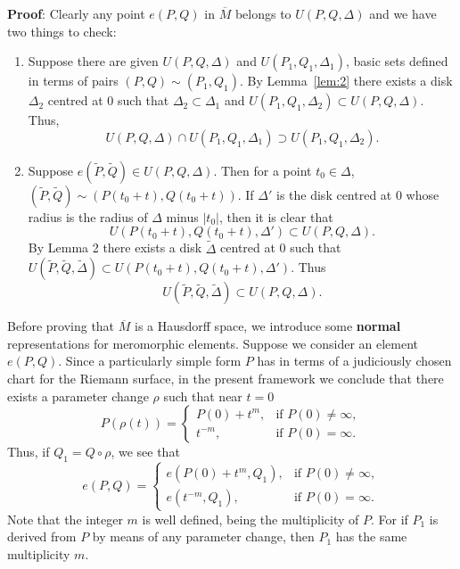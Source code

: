 \documentclass[a4paper,11pt]{article}
\begin{document}
\begin{mdframed}
  \textbf{Proof}:  Clearly any point $e(P,Q)$ in $\overline{M}$
  belongs to $U(P,Q,\Delta)$ and we have two things to check:
  \begin{enumerate}
  \item Suppose there are given $U(P,Q,\Delta)$ and $U(P_1, Q_1,
    \Delta_1)$, basic sets defined in terms of pairs $(P,Q) \sim (P_1,
    Q_1)$.  By Lemma~\ref{lem:2} there exists a disk $\Delta_2$
    centred at 0 such that $\Delta_2 \subset \Delta_1$ and $U(P_1,
    Q_1, \Delta_2) \subset U(P,Q,\Delta)$.  Thus,
    $$
    U(P,Q,\Delta) \cap U(P_1, Q_1, \Delta_1) \supset 
    U(P_1, Q_1, \Delta_2).
    $$
  \item Suppose $e(\widetilde{P},\widetilde{Q}) \in U(P,Q,\Delta)$.
    Then for a point $t_0 \in \Delta$, $(\widetilde{P},\widetilde{Q})
    \sim (P(t_0 + t), Q(t_0 + t))$.  If $\Delta'$ is the disk centred
    at 0 whose radius is the radius of $\Delta$ minus $|t_0|$, then it
    is clear that
    $$
    U(P(t_0+t), Q(t_0 + t), \Delta') \subset U(P,Q,\Delta).
    $$
    By Lemma 2 there exists a disk $\widetilde{\Delta}$ centred at 0
    such that $U(\widetilde{P},\widetilde{Q},\widetilde{\Delta})
    \subset U(P(t_0 + t), Q(t_0 + t), \Delta')$.  Thus
    $$
    U(\widetilde{P},\widetilde{Q},\widetilde{\Delta})
    \subset U(P,Q,\Delta).
    $$
  \end{enumerate}
\end{mdframed}

Before proving that $\overline{M}$ is a Hausdorff space, we introduce
some \textbf{normal} representations for meromorphic elements.
Suppose we consider an element $e(P,Q)$.  Since a particularly simple
form $P$ has in terms of a judiciously chosen chart for the Riemann
surface, in the present framework we conclude that there exists a
parameter change $\rho$ such that near $t=0$
$$
P(\rho(t)) = 
\begin{cases}
  P(0) + t^m, & \text{if }P(0) \ne \infty,\\
  t^{-m}, & \text{if }P(0) = \infty.
\end{cases}
$$
Thus, if $Q_1 = Q \circ \rho$, we see that
$$
e(P,Q) = 
\begin{cases}
  e(P(0) + t^m, Q_1), & \text{if }P(0) \ne \infty,\\
  e(t^{-m}, Q_1), & \text{if }P(0) = \infty.
\end{cases}
$$
Note that the integer $m$ is well defined, being the multiplicity of
$P$.  For if $P_1$ is derived from $P$ by means of any parameter
change, then $P_1$ has the same multiplicity $m$.
\end{document}
